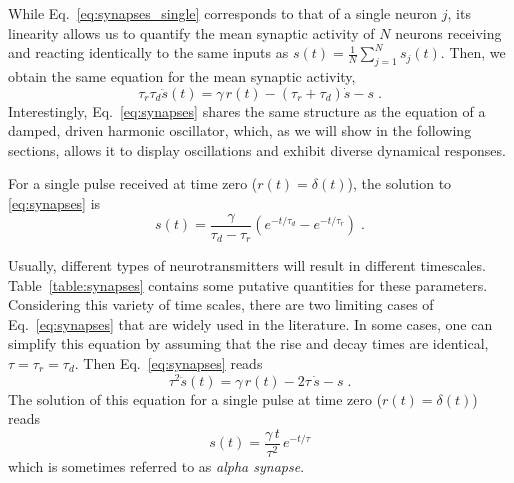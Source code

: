 \documentclass[12pt]{article}
\numberwithin{equation}{section}
\begin{document}
While Eq.~\eqref{eq:synapses_single} corresponds to that of a single neuron $j$, its linearity allows us to  quantify the mean synaptic activity of $N$ neurons receiving and reacting identically to the same inputs as
$
s(t)=\frac{1}{N}\sum_{j=1}^N s_j(t)
$.
Then, we obtain the same equation for the mean synaptic activity,
\begin{equation}\label{eq:synapses}
    \tau_r\tau_d\ddot s(t)= \gamma \, r(t) - (\tau_r+\tau_d) \dot s -s\;.
\end{equation}
Interestingly, Eq.~\eqref{eq:synapses} shares the same structure as the equation of a damped, driven harmonic oscillator, which, as we will show in the following sections, allows it to display oscillations and exhibit diverse dynamical responses.

For a single pulse received at time zero ($r(t)=\delta(t)$), the solution to \eqref{eq:synapses} is
\begin{equation}
s(t)=\frac{\gamma}{\tau_d-\tau_r}\left( e^{-t/\tau_d} - e^{-t/\tau_r}\right)\;.
\end{equation}

Usually, different types of neurotransmitters will result in different timescales.
Table~\ref{table:synapses} contains some putative quantities for these parameters.
Considering this variety of time scales, 
there are two limiting cases of Eq.~\eqref{eq:synapses} that are widely used in the literature.
In some cases, one can simplify this equation by assuming that the rise
and decay times are identical, $\tau=\tau_r=\tau_d$. 
Then Eq.~\ref{eq:synapses} reads
\begin{equation}\label{eq:synapses_2nd}
    \tau^2\ddot s(t)= \gamma \,  r(t) - 2\tau \, \dot s -s\;.
\end{equation}
The solution of this equation for a single pulse at time zero ($r(t)=\delta(t)$)
reads
\begin{equation}
s(t)=\frac{\gamma \, t}{\tau^2}\, e^{-t/\tau}
\end{equation}
which is sometimes referred to as \emph{alpha synapse}. 

\end{document}
